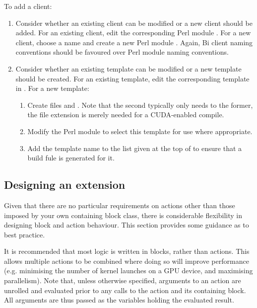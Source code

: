 To add a client:
\begin{enumerate}
\item Consider whether an existing client can be modified or a new client
  should be added. For an existing client, edit the corresponding Perl module
  . For a new client, choose a name
  and create a new Perl module . Again,
  Bi client naming conventions should be favoured over Perl module naming
  conventions.
\item Consider whether an existing template can be modified or a new template
  should be created. For an existing template, edit the corresponding template
  in . For a new template:
\begin{enumerate}
\item Create files  and
  . Note that the second
  typically only needs to  the former, the 
  file extension is merely needed for a CUDA-enabled compile.
\item Modify the Perl module to select this template for use where
  appropriate.
\item Add the template name to the list given at the top of
   to ensure that a build fule is generated
  for it.
\end{enumerate}
\end{enumerate}

\subsection{Designing an extension\label{Designing_an_extension}}

Given that there are no particular requirements on actions other than those
imposed by your own containing block class, there is considerable flexibility
in designing block and action behaviour. This section provides some guidance
as to best practice.

It is recommended that most logic is written in blocks, rather than
actions. This allows multiple actions to be combined where doing so will
improve performance (e.g. minimising the number of kernel launches on a GPU
device, and maximising parallelism). Note that, unless otherwise specified,
arguments to an action are unrolled and evaluated prior to any calls to the
action and its containing block. All arguments are thus passed as the
variables holding the evaluated result.

